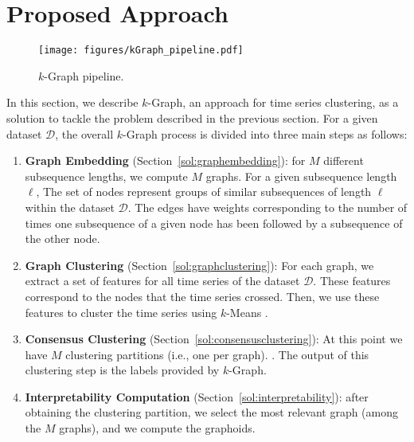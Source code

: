 \section{Proposed Approach}
\label{sec:proposed}

\begin{figure*}[tb]
 \centering
\texttt{[image: figures/kGraph\_pipeline.pdf]}
\vspace{-0.2cm}
 \caption{$k$-Graph pipeline.}
 \label{fig:pipeline}
\vspace{-0.3cm}
\end{figure*}

In this section, we describe $k$-Graph, an approach for time series clustering, as a solution to tackle the problem described in the previous section. 
For a given dataset $\mathcal{D}$, the overall $k$-Graph process is divided into three main steps as follows:

\begin{enumerate}[noitemsep, topsep=1pt, parsep=1pt, partopsep=1pt, leftmargin=0.5cm]
\item {\bf Graph Embedding} (Section~\ref{sol:graphembedding}): for $M$ different subsequence lengths, we compute $M$ graphs.
For a given subsequence length $\ell$, The set of nodes represent groups of similar subsequences of length $\ell$ within the dataset $\mathcal{D}$. The edges have weights corresponding to the number of times one subsequence of a given node has been followed by a subsequence of the other node.

\item {\bf Graph Clustering} (Section~\ref{sol:graphclustering}): For each graph, we extract a set of features for all time series of the dataset $\mathcal{D}$. These features correspond to the nodes 
that the time series crossed. Then, we use these features to cluster the time series using $k$-Means .

\item {\bf Consensus Clustering} (Section~\ref{sol:consensusclustering}): At this point we have $M$ clustering partitions (i.e., one per graph). . 
The output of this clustering step is the labels provided by $k$-Graph.

\item {\bf Interpretability Computation} (Section~\ref{sol:interpretability}): after obtaining the clustering partition, we select the most relevant graph (among the $M$ graphs), and we compute the  graphoids.
\end{enumerate}


